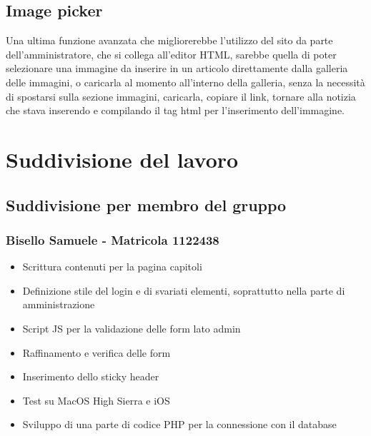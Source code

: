 \documentclass[openany, a4paper, 12pt]{report}
\begin{document}
		\section{Image picker}
		Una ultima funzione avanzata che migliorerebbe l'utilizzo del sito da parte dell'amministratore, che si collega all'editor HTML, sarebbe quella di poter selezionare una immagine da inserire in un articolo direttamente dalla galleria delle immagini, o caricarla al momento all'interno della galleria, senza la necessità di spostarsi sulla sezione immagini, caricarla, copiare il link, tornare alla notizia che stava inserendo e compilando il tag html per l'inserimento dell'immagine.



	\chapter{Suddivisione del lavoro}
	\section{Suddivisione per membro del gruppo}
	\subsection{Bisello Samuele - Matricola 1122438}
	\begin{itemize}
		\item Scrittura contenuti per la pagina capitoli
		\item Definizione stile del login e di svariati elementi, soprattutto nella parte di amministrazione
		\item Script JS per la validazione delle form lato admin
		\item Raffinamento e verifica delle form
		\item Inserimento dello sticky header
		\item Test su MacOS High Sierra e iOS
		\item Sviluppo di una parte di codice PHP per la connessione con il database
	\end{itemize}
\end{document}
